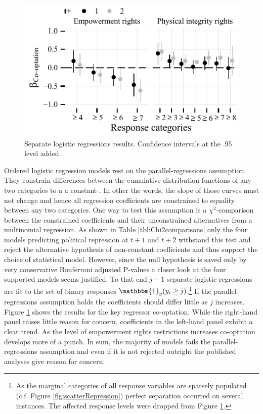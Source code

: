 \begin{figure}
\centering
\includegraphics[width=\linewidth]{./sections/03replication/parallelRegressionsCoefPlot_manualLabels.pdf}
\caption{Separate logistic regressions results. Confidence
  intervals at the .95 level added.}
\label{fig:separateLogisticCoef}
\end{figure}
Ordered logistic regression models rest on the 
parallel-regressions assumption. They constrain differences 
between the cumulative distribution functions of any two 
categories to a a constant \citep[476]{Fox.2008}. In other 
the words, the slope of those curves must not change
and hence all regression coefficients are constrained to 
equality between any two categories. One way to test this
assumption is a $\chi^2$-comparison between the constrained 
coefficients and their unconstrained alternatives from a 
multinomial regression. As shown in Table 
\ref{tbl:Chi2comparisons} only the four models 
predicting political repression at $t+1$ and $t+2$ 
withstand this test and reject the alternative hypothesis 
of non-constant coefficients and thus support the choice of
statistical model. However, since the null hypothesis is 
saved only by very conservative Bonferroni adjusted 
P-values a closer look at the four supported
models seems justified. To that end $j-1$ separate logistic 
regressions are fit to the set of binary responses 
$\mathbbm{1}_y(y_{i} \ge j)$.\footnote{As the marginal 
categories of all response variables are sparsely populated
(c.f. Figure \ref{fig:scatterRepression}) perfect
separation occurred on several instances. The affected 
response levels were dropped from Figure \ref{fig:separateLogisticCoef}.} If the parallel-regressions assumption holds
the coefficients should differ little as $j$ increases. 
Figure \ref{fig:separateLogisticCoef} shows the results for 
the key regressor co-optation. While the right-hand panel 
raises little reason for concern, coefficients in the 
left-hand panel exhibit a clear trend. As the level of 
empowerment rights restrictions increases co-optation 
develops more of a punch. In sum, the majority of models 
fails the parallel-regressions assumption and even 
if it is not rejected outright the published analyses give 
reason for concern.
